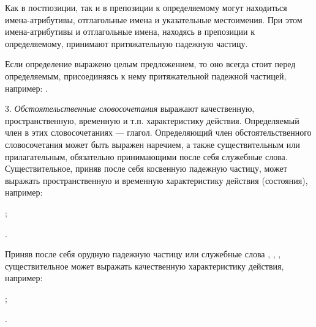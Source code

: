 Как в постпозиции, так и в препозиции к определяемому могут находиться имена-атрибутивы, отглагольные имена и указательные местоимения. При этом имена-атрибутивы и отглагольные имена, находясь в препозиции к определяемому, принимают притяжательную падежную частицу.

Если определение выражено целым предложением, то оно всегда стоит перед определяемым, присоединяясь к нему притяжательной падежной частицей, например: .

3. \emph{Обстоятельственные словосочетания} выражают качественную, пространственную, временную и т.п. характеристику действия. Определяемый член в этих словосочетаниях --- глагол. Определяющий член обстоятельственного словосочетания может быть выражен наречием, а также существительным или прилагательным, обязательно принимающими после себя служебные слова. Существительное, приняв после себя косвенную падежную частицу, может выражать пространственную и временную характеристику действия (состояния), например:
\begin{prfsample}
	\item {};
	\item {}.
\end{prfsample}
Приняв после себя орудную падежную частицу или служебные слова , , , существительное может выражать качественную характеристику действия, например:
\begin{prfsample}
	\item {};
	\item {}.
\end{prfsample}

